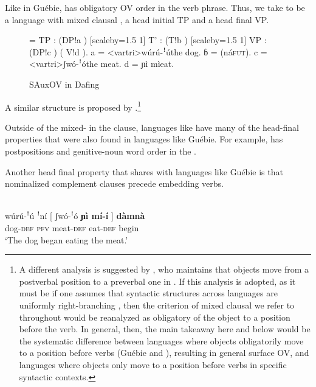 \documentclass[output=paper,newtxmath,modfonts,nonflat,draftmode]{langsci/langscibook}
\begin{document}
Like in Guébie,  has obligatory OV order in the verb phrase. Thus, we take  to be a language with mixed clausal , a head initial TP and a head final VP.

\begin{figure}
\jtree[xunit=2.5em,yunit=1.25em]
\! = {TP}
: ({DP}!a ) [scaleby=1.5 1] {T'}
: ({T}!b ) [scaleby=1.5 1] {VP}
: ({DP}!c ) ( {V}!d ).
\!a = <vartri>{{wúrú-ꜝú}}{the dog}.
ɓ = ({{ná}}{\textsc{fut}}).
\!c = <vartri>{{ʃwó-ꜝó}}{the meat}.
\!d = {{ɲì mì}}{eat}.
\endjtree	
\caption{SAuxOV in Dafing}\label{fig:sande:dafingtree}
\end{figure}

\newpage 
A similar structure is proposed by \citet{nikitina09}.\footnote{\label{koopfn}A different analysis is suggested by \citet{Koopman:1984,koopman92}, who maintains that objects move from a postverbal position to a preverbal one in . If this analysis is adopted, as it must be if one assumes that syntactic structures across languages are uniformly right-branching \citep{kayne94}, then the criterion of mixed clausal  we refer to throughout would be reanalyzed as obligatory  of the object to a position before the verb. In general, then, the main takeaway here and below would be the systematic difference between languages where objects obligatorily move to a position before verbs (Guébie and ), resulting in general surface OV, and languages where objects only move to a position before verbs in specific syntactic contexts.}

Outside of the mixed- in the clause,  languages like  have many of the head-final properties that were also found in  languages like Guébie. For example,  has postpositions  and genitive-noun word order in the  . 

Another head final property that  shares with  languages like Guébie  is that nominalized complement clauses precede embedding verbs.

\ea {}\\
\gll wúrú-ꜝú {ꜝ{ní}} [ {ʃwó-ꜝó} \textbf{{ɲì mí-í}} ] \textbf{{dàmnà}} \\
{dog}-\textsc{def} \textsc{pfv} {} meat-\textsc{def} eat-\textsc{def} {} begin\\
\glt `The dog began eating the meat.'
\z 
\end{document}
